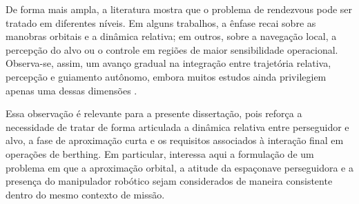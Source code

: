 De forma mais ampla, a literatura mostra que o problema de rendezvous pode ser tratado em diferentes níveis. Em alguns trabalhos, a ênfase recai sobre as manobras orbitais e a dinâmica relativa; em outros, sobre a navegação local, a percepção do alvo ou o controle em regiões de maior sensibilidade operacional. Observa-se, assim, um avanço gradual na integração entre trajetória relativa, percepção e guiamento autônomo, embora muitos estudos ainda privilegiem apenas uma dessas dimensões \cite{arantes2010far,fiori2024modeling}.

Essa observação é relevante para a presente dissertação, pois reforça a necessidade de tratar de forma articulada a dinâmica relativa entre perseguidor e alvo, a fase de aproximação curta e os requisitos associados à interação final em operações de berthing. Em particular, interessa aqui a formulação de um problema em que a aproximação orbital, a atitude da espaçonave perseguidora e a presença do manipulador robótico sejam considerados de maneira consistente dentro do mesmo contexto de missão.